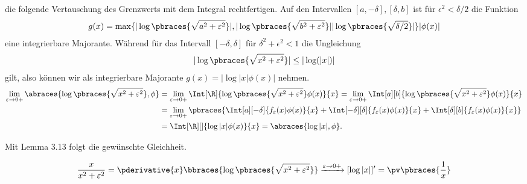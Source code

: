 \begin{solution}
die folgende Vertauschung des Grenzwerts mit dem Integral rechtfertigen.
Auf den Intervallen $[a,-\delta], [\delta, b]$ ist für $\epsilon^2 < \delta/2$
die Funktion
\begin{align*}
  g(x) = \max\{|\log\pbraces{\sqrt{a^2 + \varepsilon^2}}|, |\log\pbraces{\sqrt{b^2 + \varepsilon^2}}| |\log\pbraces{\sqrt{\delta/2}}|\}|\phi(x)|
\end{align*} eine
integrierbare Majorante.
Während für das Intervall $[-\delta,\delta]$ für $ \delta^2 + \epsilon^2 < 1$ die Ungleichung
\begin{align*}
  |\log\pbraces{\sqrt{x^2 + \varepsilon^2}}| \leq |\log(|x|)|
\end{align*}
gilt, also können wir als integrierbare Majorante $g(x) = |\log{|x|}\phi(x)|$ nehmen.
\begin{align*}
    \lim_{\varepsilon \to 0+}
    \abraces{\log \pbraces{\sqrt{x^2 + \varepsilon^2}}, \phi}
    & =
    \lim_{\varepsilon \to 0+}
    \Int[\R]{\log\pbraces{\sqrt{x^2 + \varepsilon^2}} \phi(x)}{x}
    =
    \lim_{\varepsilon \to 0+}
    \Int[a][b]{\log\pbraces{\sqrt{x^2 + \varepsilon^2}} \phi(x)}{x} \\
    & =
    \lim_{\varepsilon \to 0+}
    \pbraces
    {
        \Int[a][-\delta]{f_\varepsilon(x)\phi(x)}{x}
        +
        \Int[-\delta][\delta]{f_\varepsilon(x)\phi(x)}{x}
        +
        \Int[\delta][b]{f_\varepsilon(x) \phi(x)}{x}
    } \\
    & =
    \Int[\R][]{\log|x| \phi(x)}{x}
    =
    \abraces{\log|x|, \phi}.
\end{align*}

Mit Lemma 3.13 folgt die gewünschte Gleichheit.

\begin{align*}
    \frac{x}{x^2 + \varepsilon^2}
    =
    \pderivative{x}
    \bbraces
    {
        \log
        \pbraces
        {
            \sqrt{x^2 + \varepsilon^2}
        }
    }
    \xrightarrow{\varepsilon \to 0+}
    [\log{|x|}]^\prime
    =
    \pv \pbraces{\frac{1}{x}}
\end{align*}

\end{solution}

